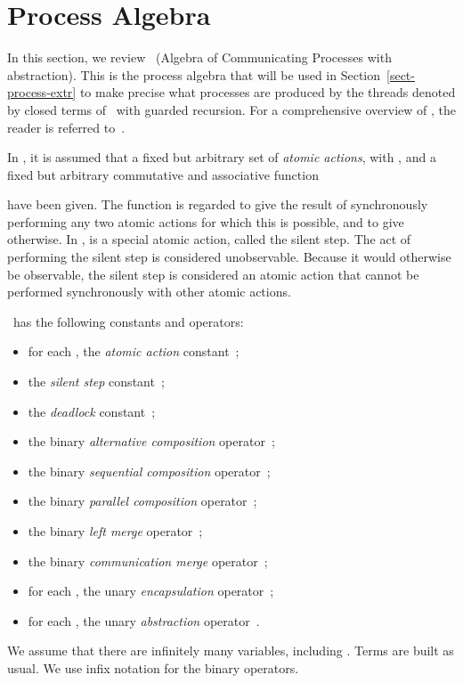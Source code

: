 \documentclass[fleqn]{llncs}
\begin{document}
\section{Process Algebra}
\label{sect-ACP}

In this section, we review \ACPt\ (Algebra of Communicating Processes
with abstraction).
This is the process algebra that will be used in
Section~\ref{sect-process-extr} to make precise what processes are
produced by the threads denoted by closed terms of \BTA\ with guarded
recursion.
For a comprehensive overview of \ACPt, the reader is referred
to~\cite{BW90,Fok00}.

In \ACPt, it is assumed that a fixed but arbitrary set  of
\emph{atomic actions}, with , and a fixed but
arbitrary commutative and associative function

have been given.
The function  is regarded to give the result of synchronously
performing any two atomic actions for which this is possible, and to
give  otherwise.
In \ACPt,  is a special atomic action, called the silent step.
The act of performing the silent step is considered unobservable.
Because it would otherwise be observable, the silent step is considered
an atomic action that cannot be performed synchronously with other
atomic actions.

\ACPt\ has the following constants and operators:
\begin{itemize}
\item
for each , the \emph{atomic action} constant \,;
\item
the \emph{silent step} constant \,;
\item
the \emph{deadlock} constant \,;
\item
the binary \emph{alternative composition} operator \,;
\item
the binary \emph{sequential composition} operator \,;
\item
the binary \emph{parallel composition} operator \,;
\item
the binary \emph{left merge} operator \,;
\item
the binary \emph{communication merge} operator \,;
\item
for each , the unary \emph{encapsulation} operator
\,;
\item
for each , the unary \emph{abstraction} operator
\,.
\end{itemize}
We assume that there are infinitely many variables, including .
Terms are built as usual.
We use infix notation for the binary operators.
\end{document}
